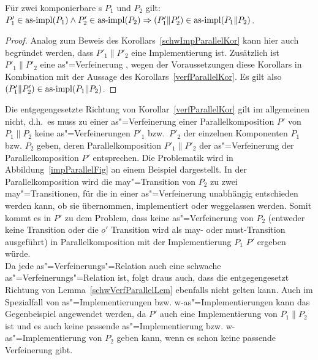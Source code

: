 \begin{Kor}
  Für zwei komponierbare \MEIO{}s $P_1$ und $P_2$ gilt:
  $P'_1\in\mathrm{as}\text{-}\mathrm{impl} (P_1) \land P'_2 \in\mathrm{as}\text{-}\mathrm{impl} (P_2) \Rightarrow (P'_1\|P'_2)
  \in\mathrm{as}\text{-}\mathrm{impl} (P_1\|P_2)$.
\end{Kor}
\begin{proof}
  Analog zum Beweis des Korollars~\ref{schwImpParallelKor} kann hier auch
  begründet werden, dass $P'_1\|P'_2$ eine Implementierung ist. Zusätzlich
  ist $P'_1\|P'_2$ eine as"=Verfeinerung , wegen der Voraussetzungen diese
  Korollars in Kombination mit der Aussage des Korollars~\ref{verfParallelKor}.
  Es gilt also $(P'_1\|P'_2)\in\mathrm{as}\text{-}\mathrm{impl} (P_1\|P_2)$.
\end{proof}

Die entgegengesetzte Richtung von Korollar~\ref{verfParallelKor} gilt im
allgemeinen nicht, d.h.\ es muss zu einer as"=Verfeinerung einer
Parallelkomposition $P'$ von $P_1\|P_2$ keine as"=Verfeinerungen $P'_1$ bzw.\
$P'_2$ der einzelnen Komponenten $P_1$ bzw. $P_2$ geben, deren
Parallelkomposition $P'_1\|P'_2$ der as"=Verfeinerung der Parallelkomposition
$P'$ entsprechen. Die Problematik wird in Abbildung~\ref{impParallelFig} an
einem Beispiel dargestellt. In der Parallelkomposition wird die may"=Transition
von $P_2$ zu zwei may"=Transitionen, für die in einer as"=Verfeinerung
unabhängig entschieden werden kann, ob sie übernommen, implementiert oder
weggelassen werden. Somit kommt es in $P'$ zu dem Problem, dass keine
as"=Verfeinerung von $P_2$ (entweder keine Transition oder die $o'$ Transition
wird als may- oder must-Transition ausgeführt) in Parallelkomposition mit der
Implementierung $P_1$ $P'$ ergeben würde.\\
Da jede as"=Verfeinerungs"=Relation auch eine schwache
as"=Verfeinerungs"=Relation ist, folgt draus auch, dass die entgegengesetzt
Richtung von Lemma~\ref{schwVerfParallelLem} ebenfalls nicht gelten kann. Auch
im Spezialfall von as"=Implementierungen bzw. w-as"=Implementierungen kann das
Gegenbeispiel angewendet werden, da $P'$ auch eine Implementierung von
$P_1\|P_2$ ist und es auch keine passende as"=Implementierung bzw.
w-as"=Implementierung von $P_2$ geben kann, wenn es schon keine passende
Verfeinerung gibt.

